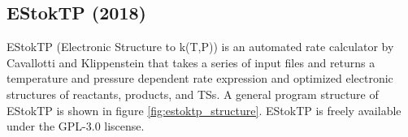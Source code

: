 \documentclass[preprint, 11pt]{elsarticle} %
\begin{document}


\subsection{EStokTP (2018)}


EStokTP (Electronic Structure to k(T,P)) \cite{estoktp:2018} is an automated rate calculator by Cavallotti and Klippenstein that takes a series of input files and returns a temperature and pressure dependent rate expression and optimized electronic structures of reactants, products, and TSs.
A general program structure of EStokTP is shown in figure \ref{fig:estoktp_structure}.
EStokTP is freely available under the GPL-3.0 liscense.
\end{document}
